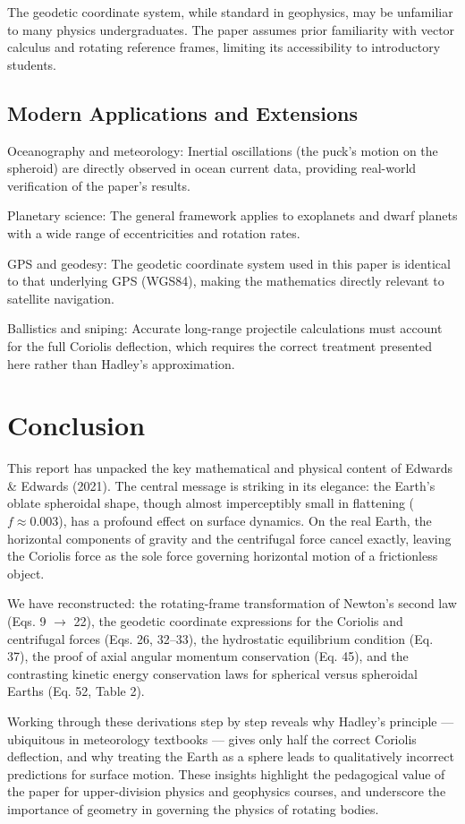\documentclass[10pt, a4paper]{article}
\begin{document}
The geodetic coordinate system, while standard in geophysics, may be unfamiliar to many physics undergraduates. The paper assumes prior familiarity with vector calculus and rotating reference frames, limiting its accessibility to introductory students.

\subsection{Modern Applications and Extensions}
Oceanography and meteorology: Inertial oscillations (the puck’s motion on the spheroid) are directly observed in ocean current data, providing real-world verification of the paper’s results. 

Planetary science: The general framework applies to exoplanets and dwarf planets with a wide range of eccentricities and rotation rates. 

GPS and geodesy: The geodetic coordinate system used in this paper is identical to that underlying GPS (WGS84), making the mathematics directly relevant to satellite navigation. 

Ballistics and sniping: Accurate long-range projectile calculations must account for the full Coriolis deflection, which requires the correct treatment presented here rather than Hadley’s approximation.

\section{Conclusion}
This report has unpacked the key mathematical and physical content of Edwards \& Edwards (2021). The central message is striking in its elegance: the Earth’s oblate spheroidal shape, though almost imperceptibly small in flattening ($f \approx 0.003$), has a profound effect on surface dynamics. On the real Earth, the horizontal components of gravity and the centrifugal force cancel exactly, leaving the Coriolis force as the sole force governing horizontal motion of a frictionless object. 

We have reconstructed: the rotating-frame transformation of Newton’s second law (Eqs. 9 $\rightarrow$ 22), the geodetic coordinate expressions for the Coriolis and centrifugal forces (Eqs. 26, 32–33), the hydrostatic equilibrium condition (Eq. 37), the proof of axial angular momentum conservation (Eq. 45), and the contrasting kinetic energy conservation laws for spherical versus spheroidal Earths (Eq. 52, Table 2). 

Working through these derivations step by step reveals why Hadley’s principle — ubiquitous in meteorology textbooks — gives only half the correct Coriolis deflection, and why treating the Earth as a sphere leads to qualitatively incorrect predictions for surface motion. These insights highlight the pedagogical value of the paper for upper-division physics and geophysics courses, and underscore the importance of geometry in governing the physics of rotating bodies.
\end{document}
